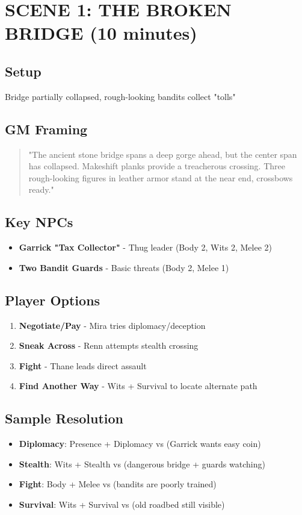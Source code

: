 \documentclass[11pt]{article}
\begin{document}
\section{SCENE 1: THE BROKEN BRIDGE (10 minutes)}

\subsection*{Setup}
Bridge partially collapsed, rough-looking bandits collect "tolls"

\subsection*{GM Framing}
\begin{quote}
"The ancient stone bridge spans a deep gorge ahead, but the center span has collapsed. Makeshift planks provide a treacherous crossing. Three rough-looking figures in leather armor stand at the near end, crossbows ready."
\end{quote}

\subsection*{Key NPCs}
\begin{itemize}
\item \textbf{Garrick "Tax Collector"} - Thug leader (Body 2, Wits 2, Melee 2)
\item \textbf{Two Bandit Guards} - Basic threats (Body 2, Melee 1)
\end{itemize}

\subsection*{Player Options}
\begin{enumerate}
\item \textbf{Negotiate/Pay} - Mira tries diplomacy/deception
\item \textbf{Sneak Across} - Renn attempts stealth crossing
\item \textbf{Fight} - Thane leads direct assault
\item \textbf{Find Another Way} - Wits + Survival to locate alternate path
\end{enumerate}

\subsection*{Sample Resolution}
\begin{itemize}
\item \textbf{Diplomacy}: Presence + Diplomacy vs  (Garrick wants easy coin)
\item \textbf{Stealth}: Wits + Stealth vs  (dangerous bridge + guards watching)
\item \textbf{Fight}: Body + Melee vs  (bandits are poorly trained)
\item \textbf{Survival}: Wits + Survival vs  (old roadbed still visible)
\end{itemize}
\end{document}
